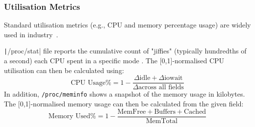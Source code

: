 \subsubsection{Utilisation Metrics}
Standard utilisation metrics (e.g., CPU and memory percentage usage) are widely
used in industry~\cite{hadoop2016apache,sahasrabudhe_improved_2015}.

\texttt|/proc/stat| file reports the cumulative count of "jiffies" (typically
hundredths of a second) each CPU spent in a specific mode \cite{proc_stat5}. The
[0,1]-normalised CPU utilisation can then be calculated using:
\[ \text{CPU Usage\%} = 1 - \frac{\Delta\text{idle} +
\Delta\text{iowait}}{\Delta\text{across all fields}} \]
In addition, \verb|/proc/meminfo| shows a snapshot of the memory usage in
kilobytes. The [0,1]-normalised memory usage can then be calculated from the given
field:
\[ \text{Memory Used\%} = 1 - \frac{\text{MemFree} +
\text{Buffers} + \text{Cached}}{\text{MemTotal}}\]

